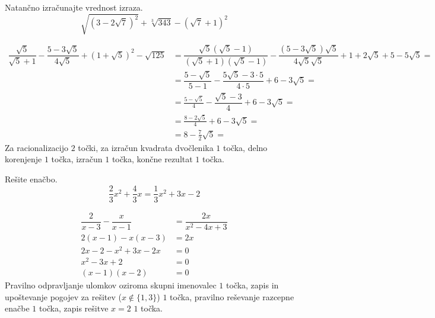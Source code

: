 \documentclass[addpoints]{exam}
\begin{document}
\begin{questions}


    \question[5]
    Natančno izračunajte vrednost izraza.
    $$ \sqrt{\left(3-2\sqrt{7}\right)^2}+\sqrt[3]{343}-\left(\sqrt{7}+1\right)^2 $$

    \begin{solution}[7cm]
        \begin{align*} 
            \dfrac{\sqrt{5}}{\sqrt{5}+1}-\dfrac{5-3\sqrt{5}}{4\sqrt{5}}+\left(1+\sqrt{5}\right)^2-\sqrt{125}&=\dfrac{\sqrt{5}(\sqrt{5}-1)}{(\sqrt{5}+1)(\sqrt{5}-1)}-\dfrac{(5-3\sqrt{5})\sqrt{5}}{4\sqrt{5}\sqrt{5}}+1+2\sqrt{5}+5-5\sqrt{5}= \\
                                                                                                            &=\dfrac{5-\sqrt{5}}{5-1}-\dfrac{5\sqrt{5}-3\cdot 5}{4\cdot 5}+6-3\sqrt{5}= \\
                                                                                                            &=\frac{5-\sqrt{5}}{4}-\dfrac{\sqrt{5}-3}{4}+6-3\sqrt{5}= \\
                                                                                                            &=\frac{8-2\sqrt{5}}{4}+6-3\sqrt{5}= \\
                                                                                                            &=8-\frac{7}{2}\sqrt{5}= 
        \end{align*}
        Za racionalizacijo $2$ točki, za izračun kvadrata dvočlenika $1$ točka, delno korenjenje $1$ točka, izračun $1$ točka, končne rezultat $1$ točka.
    \end{solution}
    
    

    \question[4]
    Rešite enačbo.
    $$ \frac{2}{3}x^2+\frac{4}{3}x=\frac{1}{3}x^2+3x-2 $$
    
    
    \begin{solution}[4cm]
        \begin{align*} 
            \dfrac{2}{x-3}-\dfrac{x}{x-1} &=\dfrac{2x}{x^2-4x+3} \\
            2(x-1)-x(x-3) &= 2x \\
            2x-2-x^2+3x-2x &=0 \\
            x^2-3x+2 &=0 \\
            (x-1)(x-2) &=0
        \end{align*}
        Pravilno odpravljanje ulomkov oziroma skupni imenovalec $1$ točka, zapis in upoštevanje pogojev za rešitev ($x\notin\{1,3\}$) $1$ točka, pravilno reševanje razcepne enačbe $1$ točka, zapis rešitve $x=2$ $1$ točka.
    \end{solution}


\end{questions}
\end{document}
